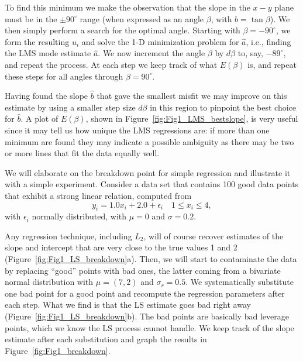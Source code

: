 To find this minimum we make the observation that the slope in 
the $x-y$ plane must be in the $\pm 90^{\circ}$ range (when expressed as an angle $\beta$, with $b = \tan \beta$).
We then simply perform a search for the optimal angle.  Starting 
with $\beta = -90 ^{\circ}$, we form the resulting $u_i$ and solve the 1-D minimization problem for $\hat{a}$, i.e., 
finding the LMS mode estimate $\hat{a}$.  We now increment the angle $\beta$ by $d\beta$ to, say, $-89 ^{\circ}$, and 
repeat the process.  At each step we keep track of what $E(\beta)$ is, and repeat these steps for all angles 
through $\beta = 90^{\circ}$.


Having found the slope $\hat{b}$ that gave the smallest misfit we may improve on this estimate by using a smaller step size $d\beta$ in this region 
to pinpoint the best choice for $\hat{b}$.  A plot of $E(\beta)$, shown in Figure~\ref{fig:Fig1_LMS_bestslope},
is very useful since it may tell us how 
unique the LMS regressions are: if more than one minimum are found they may indicate a possible 
ambiguity as there may be two or more lines that fit the data equally well.

	We will elaborate on the breakdown point for simple regression and illustrate it with 
a simple experiment.  Consider a data set that contains 100 good data points that exhibit a 
strong linear relation, computed from
\begin{equation}
y_i = 1.0 x_i + 2.0 + \epsilon_i \quad 1 \leq x_i \leq 4,
\end{equation}
with $\epsilon_i$ normally distributed, with $\mu = 0$ and $\sigma =0.2$.


	Any regression technique, including $L_2$, will of course recover estimates of the slope and 
intercept that are very close to the true values 1 and 2 (Figure~\ref{fig:Fig1_LS_breakdown}a).  Then, we will start to contaminate the data 
by replacing ``good'' points with bad ones, the latter coming from a bivariate normal distribution 
with $\mu = (7, 2)$ and $\sigma_r = 0.5$.  We systematically substitute one bad point for a good point and 
recompute the regression parameters after each step.  What we find is that the LS estimate goes 
bad right away (Figure~\ref{fig:Fig1_LS_breakdown}b).  The bad points are basically bad leverage points, which we know the LS process 
cannot handle.  We keep track of the slope estimate after each substitution and graph the results
in Figure~\ref{fig:Fig1_breakdown}.

